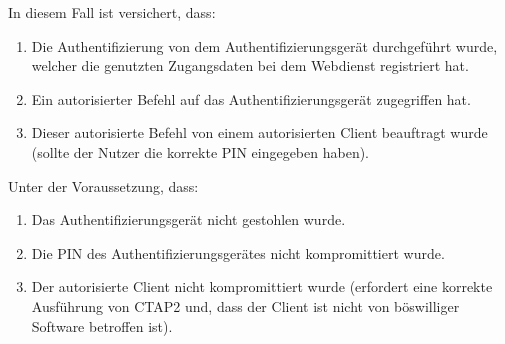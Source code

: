 In diesem Fall ist versichert, dass:

\begin{enumerate}
    \item Die Authentifizierung von dem Authentifizierungsgerät durchgeführt wurde, welcher die genutzten Zugangsdaten bei dem Webdienst registriert hat.
    \item Ein autorisierter Befehl auf das Authentifizierungsgerät zugegriffen hat.
    \item Dieser autorisierte Befehl von einem autorisierten Client beauftragt wurde (sollte der Nutzer die korrekte PIN eingegeben haben).
\end{enumerate}

Unter der Voraussetzung, dass:

\begin{enumerate}
    \item Das Authentifizierungsgerät nicht gestohlen wurde.
    \item Die PIN des Authentifizierungsgerätes nicht kompromittiert wurde.
    \item Der autorisierte Client nicht kompromittiert wurde (erfordert eine korrekte Ausführung von \ac{CTAP2} und, dass der Client ist nicht von böswilliger Software betroffen ist).
\end{enumerate}

